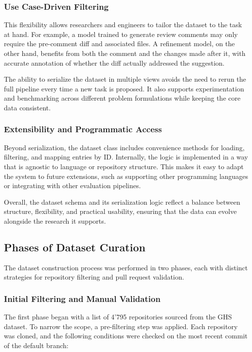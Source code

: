 \subsubsection{Use Case-Driven Filtering}

This flexibility allows researchers and engineers to tailor the dataset to the task at hand. For
example, a model trained to generate review comments may only require the pre-comment diff and
associated files. A refinement model, on the other hand, benefits from both the comment and the
changes made after it, with accurate annotation of whether the diff actually addressed the
suggestion.

The ability to serialize the dataset in multiple views avoids the need to rerun the full pipeline
every time a new task is proposed. It also supports experimentation and benchmarking across
different problem formulations while keeping the core data consistent.

\subsubsection{Extensibility and Programmatic Access}

Beyond serialization, the dataset class includes convenience methods for loading, filtering, and
mapping entries by ID. Internally, the logic is implemented in a way that is agnostic to language or
repository structure. This makes it easy to adapt the system to future extensions, such as
supporting other programming languages or integrating with other evaluation pipelines.

Overall, the dataset schema and its serialization logic reflect a balance between structure,
flexibility, and practical usability, ensuring that the data can evolve alongside the research it
supports.

\subsection{Phases of Dataset Curation}

The dataset construction process was performed in two phases, each with distinct strategies for
repository filtering and pull request validation.

\subsubsection{Initial Filtering and Manual Validation}

The first phase began with a list of 4'795 repositories sourced from the GHS dataset. To narrow the
scope, a pre-filtering step was applied. Each repository was cloned, and the following conditions
were checked on the most recent commit of the default branch:

